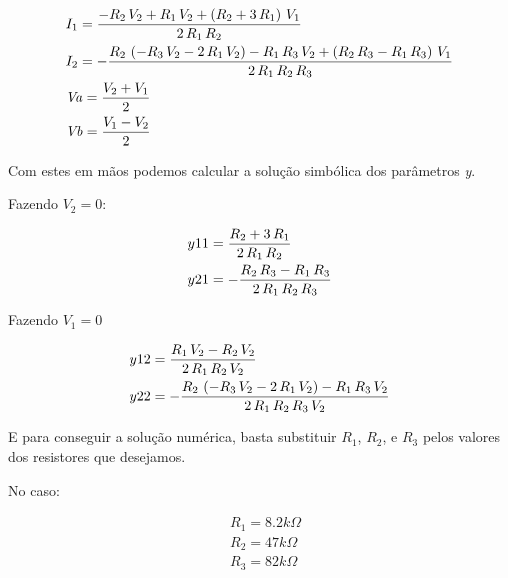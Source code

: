 \documentclass[12pt,twoside, a4paper, twocolumn]{article}
\begin{document}
\begin{equation}
    \begin{aligned}
         & I_{1}={{-R_{2}\,V_{2}+R_{1}\,V_{2}+\left(R_{2}+3\,R_{1}\right)\, V_{1}}\over{2\,R_{1}\,R_{2}}}                                                                \\
         & I_{2}=-{{R_{2}\,\left(-R_{3}\,V_{2}-2\,R_{1}\,V_{2}\right)-R_{1}\, R_{3}\,V_{2}+\left(R_{2}\,R_{3}-R_{1}\,R_{3}\right)\,V_{1}}\over{2\, R_{1}\,R_{2}\,R_{3}}} \\
         & {\it Va}={{V_{2}+V_{1}}\over{2}}                                                                                                                              \\
         & {\it Vb}={{V_{1}-V_{2}}\over{2}}
    \end{aligned}
\end{equation}


Com estes em mãos podemos calcular a solução simbólica dos parâmetros \emph{y}.


Fazendo $V_2 = 0$:


\begin{equation}
    \begin{aligned}
         & y11 = {{R_{2}+3\,R_{1}}\over{2\,R_{1}\,R_{2}}}                    \\
         & y21 = -{{R_{2}\,R_{3}-R_{1}\,R_{3}}\over{2\,R_{1}\,R_{2}\,R_{3}}}
    \end{aligned}
\end{equation}


Fazendo $V_1 = 0$


\begin{equation}
    \begin{aligned}
         & y12 = {{R_{1}\,V_{2}-R_{2}\,V_{2}}\over{2\,R_{1}\,R_{2}\,V_{2}}}                                                      \\
         & y22 = -{{R_{2}\,\left(-R_{3}\,V_{2}-2\,R_{1}\,V_{2}\right)-R_{1}\,R_{3}\, V_{2}}\over{2\,R_{1}\,R_{2}\,R_{3}\,V_{2}}}
    \end{aligned}
\end{equation}


E para conseguir a solução numérica, basta substituir $R_1$, $R_2$, e $R_3$ pelos valores dos resistores que desejamos.


No caso:


\begin{equation}
    \begin{aligned}
         & R_1 = 8.2k \varOmega \\
         & R_2 = 47k \varOmega  \\
         & R_3 = 82k \varOmega  \\
    \end{aligned}
\end{equation}
\end{document}
